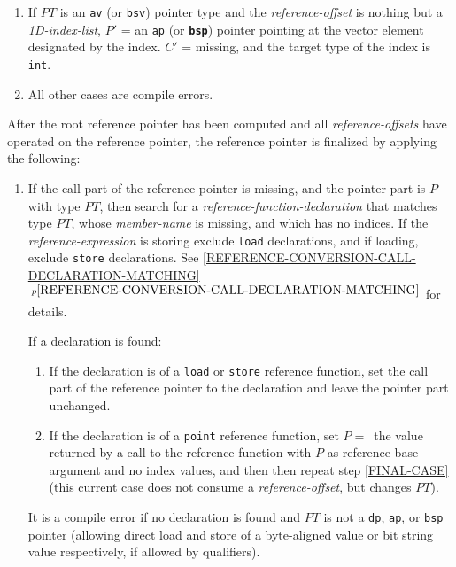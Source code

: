 \documentclass[12pt]{article}
\newcommand{\TT}[1]{{\tt \bfseries #1}}
\newcommand{\itemref}[1]{\ref{#1}$\,^{p\pageref{#1}}$}
\begin{document}
\begin{enumerate}[resume]
It is a compile-time error if the user defined type has no field
with the {\em field-label} or {\em subfield-label}
in the {\em reference-offset}, or if the total dimensions of the field
or subfield does not equal the size of the {\em offset-index-list}.

\item\label{AV-FV-CASE}
If $PT$ is an {\tt av} (or {\tt bsv}) pointer type and the
{\em reference-offset} is nothing but a {\em 1D-index-list},
$P'$ = an {\tt ap} (or \TT{bsp}) pointer pointing at the
vector element designated by the index.
$C'$ = missing, and the target type of the index
is {\tt int}.

\item All other cases are compile errors.

\end{enumerate}

After the root reference pointer has been computed and all
{\em reference-offsets} have operated on the reference pointer,
the reference pointer is finalized by applying the following:
\begin{enumerate}[resume]
\item\label{FINAL-CASE}
If the call part of the reference pointer is missing, and the pointer
part is $P$ with type $PT$,
then search for
a {\em reference-function-declaration} that matches type $PT$,
whose {\em member-name} is missing, and which has no indices.
If the {\em reference-expression} is storing exclude
{\tt load} declarations, and if loading, exclude {\tt store} declarations.
See
\itemref{REFERENCE-CONVERSION-CALL-DECLARATION-MATCHING} for details.

If a declaration is found:
\begin{enumerate}
\item If the declaration is of a {\tt load} or {\tt store} reference function,
set the call part of the reference pointer to the declaration and
leave the pointer part unchanged.
\item If the declaration is of a {\tt point} reference function,
set $P=$~the value returned by a call to the reference function
with $P$ as reference base argument and no index values, and then
then repeat step \ref{FINAL-CASE} (this current case does not consume a
{\em reference-offset}, but changes $PT$).
\end{enumerate}

It is a compile error if no declaration is found
and $PT$ is not a {\tt dp}, {\tt ap}, or {\tt bsp} pointer
(allowing direct load and
store of a byte-aligned value or bit string value respectively, if allowed
by qualifiers).

\end{enumerate}
\end{document}

